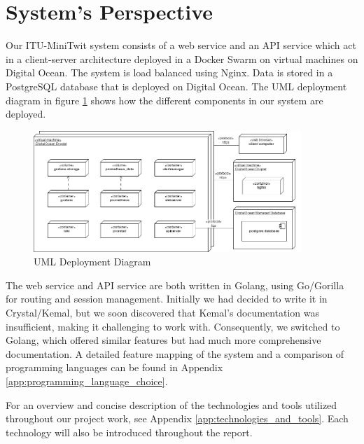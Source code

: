 \section{System's Perspective}



Our ITU-MiniTwit system consists of a web service and an API service which act in a client-server architecture deployed in a Docker Swarm on virtual machines on Digital Ocean. 
The system is load balanced using Nginx. Data is stored in a PostgreSQL database that is deployed on Digital Ocean. 
The UML deployment diagram in figure \ref{fig:deployment} shows how the different components in our system are deployed.

\begin{figure}[h]
    \centering
    \includegraphics[width=0.9\textwidth]{images/deployment.png}
    \caption{UML Deployment Diagram}
    \label{fig:deployment}
\end{figure}

The web service and API service are both written in Golang, using Go/Gorilla for routing and session management. Initially we had decided to write it in Crystal/Kemal, but we soon discovered that Kemal's documentation was insufficient, making it challenging to work with. Consequently, we switched to Golang, which offered similar features but had much more comprehensive documentation. 
A detailed feature mapping of the system and a comparison of programming languages can be found in Appendix \ref{app:programming_language_choice}. 

For an overview and concise description of the technologies and tools utilized throughout our project work, see Appendix \ref{app:technologies_and_tools}. Each technology will also be introduced throughout the report.


